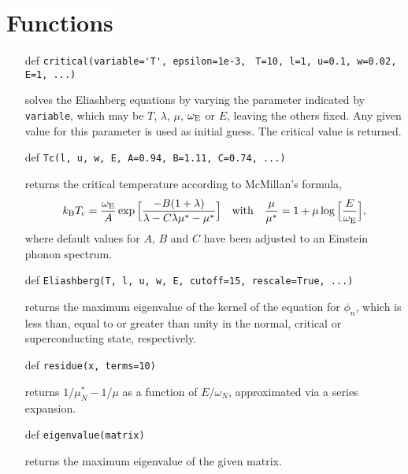 \documentclass[a4paper]{article}
\def\sub#1{\sb{\mathrm{#1}}}
\def\headline#1{\section*{\normalsize\normalfont%
   \rlap{\rule[0.5ex]{\textwidth}{0.4pt}}\qquad\colorbox{white}{#1}}}
\begin{document}
   \headline{Functions}

   \begin{itemize}
      \item[def]
         \verb|critical(variable='T', epsilon=1e-3,|
         \verb| T=10, l=1, u=0.1, w=0.02, E=1, ...)|

      solves the Eliashberg equations by varying the parameter indicated by
      \verb|variable|, which may be $T$, $\lambda$, $\mu$, $\omega \sub E$ or
      $E$, leaving the others fixed. Any given value for this parameter is used
      as initial guess. The critical value is returned.

      \item[def] \verb|Tc(l, u, w, E, A=0.94, B=1.11, C=0.74, ...)|

      returns the critical temperature according to McMillan's formula,
      \begin{equation*}
         k \sub B T \sub c = \frac {\omega \sub E} A \exp
         \Big[ \frac{-B (1 + \lambda)}{\lambda - C \lambda \mu^* - \mu^*} \Big]
         \quad \text{with} \quad
         \frac \mu {\mu^*} = 1 + \mu \log \Big[ \frac E {\omega \sub E} \Big],
      \end{equation*}
      where default values for $A$, $B$ and $C$ have been adjusted to an
      Einstein phonon spectrum.

      \item[def] \verb|Eliashberg(T, l, u, w, E, cutoff=15, rescale=True, ...)|

      returns the maximum eigenvalue of the kernel of the equation for $\phi_n$,
      which is less than, equal to or greater than unity in the normal, critical
      or superconducting state, respectively.

      \item[def] \verb|residue(x, terms=10)|

      returns $1 / \mu^*_N - 1 / \mu$ as a function of $E / \omega_N$,
      approximated via a series expansion.

      \item[def] \verb|eigenvalue(matrix)|

      returns the maximum eigenvalue of the given matrix.
   \end{itemize}
\end{document}
